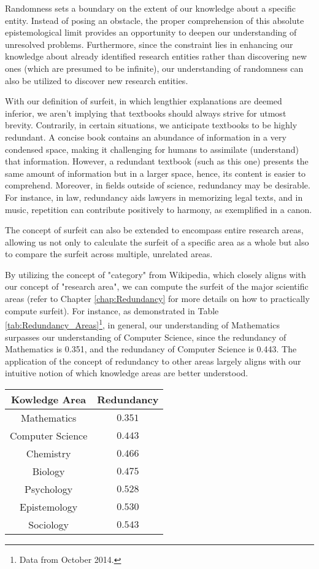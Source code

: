Randomness sets a boundary on the extent of our knowledge about a specific entity. Instead of posing an obstacle, the proper comprehension of this absolute epistemological limit provides an opportunity to deepen our understanding of unresolved problems. Furthermore, since the constraint lies in enhancing our knowledge about already identified research entities rather than discovering new ones (which are presumed to be infinite), our understanding of randomness can also be utilized to discover new research entities.

With our definition of surfeit, in which lengthier explanations are deemed inferior, we aren't implying that textbooks should always strive for utmost brevity. Contrarily, in certain situations, we anticipate textbooks to be highly redundant. A concise book contains an abundance of information in a very condensed space, making it challenging for humans to assimilate (understand) that information. However, a redundant textbook (such as this one) presents the same amount of information but in a larger space, hence, its content is easier to comprehend. Moreover, in fields outside of science, redundancy may be desirable. For instance, in law, redundancy aids lawyers in memorizing legal texts, and in music, repetition can contribute positively to harmony, as exemplified in a canon.

The concept of surfeit can also be extended to encompass entire research areas, allowing us not only to calculate the surfeit of a specific area as a whole but also to compare the surfeit across multiple, unrelated areas.

\begin{example}
By utilizing the concept of "category" from Wikipedia, which closely aligns with our concept of "research area", we can compute the surfeit of the major scientific areas (refer to Chapter \ref{chap:Redundancy} for more details on how to practically compute surfeit). For instance, as demonstrated in Table \ref{tab:Redundancy_Areas}\footnote{Data from October 2014.}, in general, our understanding of Mathematics surpasses our understanding of Computer Science, since the redundancy of Mathematics is 0.351, and the redundancy of Computer Science is 0.443. The application of the concept of redundancy to other areas largely aligns with our intuitive notion of which knowledge areas are better understood.
\end{example}

\begin{table*}
\begin{centering}
\begin{tabular}{|c|c|}
\hline 
Kowledge Area & Redundancy \tabularnewline
\hline 
\hline 
Mathematics & $0.351$ \tabularnewline
\hline 
Computer Science & $0.443$ \tabularnewline
\hline 
Chemistry & $0.466$ \tabularnewline
\hline 
Biology & $0.475$ \tabularnewline
\hline 
Psychology & $0.528$ \tabularnewline
\hline 
Epistemology & $0.530$ \tabularnewline
\hline 
Sociology & $0.543$ \tabularnewline
\hline 
\end{tabular}
\par\end{centering}
\caption{\label{tab:Redundancy_Areas}Redundancy of Scientific Areas}
\end{table*}


